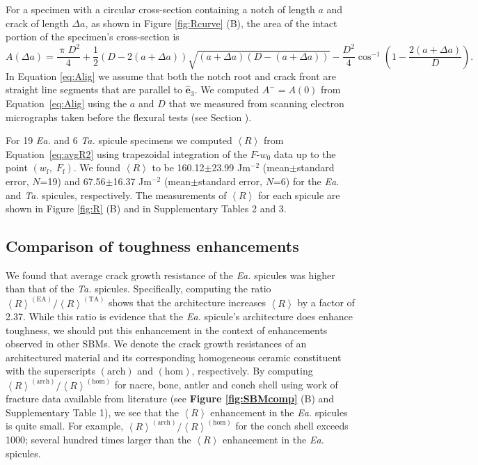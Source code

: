 \documentclass[12pt,onecolumn]{article}
\makeatletter
\DeclareRobustCommand*{\nameref}[1]{%
      \emph{\myorg@nameref{#1}}%
    }%
\newcommand{\ez}{\hat{\mathbf{e}}_3}
\newcommand{\TA}{\textit{Ta.\@}\xspace}
\newcommand{\EA}{\textit{Ea.\@}\xspace}
\makeatother
\begin{document}
For a specimen with a circular cross-section containing a notch of length $a$ and crack of length $\Delta a$, as shown in Figure \ref{fig:Rcurve} (B), the area of the intact portion of the specimen's cross-section is
%
\begin{equation}
    \label{eq:Alig}
    A(\Delta a)=\frac{\uppi D^2}{4}+\frac{1}{2}\left(D-2(a+\Delta a)\right)\sqrt{(a+\Delta a)(D-(a+\Delta a))}-\frac{D^2}{4}\cos^{-1}\left(1-\frac{2(a+\Delta a)}{D}\right).
\end{equation}
%
In Equation \eqref{eq:Alig} we assume that both the notch root and crack front are straight line segments that are parallel to $\ez$. We computed $A^-=A(0)$ from Equation~\eqref{eq:Alig} using the $a$ and $D$ that we measured from scanning electron micrographs taken before the flexural tests (see Section \nameref{sec:res}).

For 19 \EA and 6 \TA spicule specimens we computed $\left< R\right>$ from Equation~\eqref{eq:avgR2} using trapezoidal integration of the $F$-$w_0$ data up to the point $(w_\mathrm{f}, \; F_\mathrm{f})$. We found  $\left< R \right>$ to be 160.12$\pm$23.99 Jm$^{-2}$ (mean$\pm$standard error, $N$=19) and 67.56$\pm$16.37 Jm$^{-2}$ (mean$\pm$standard error, $N$=6) for the \EA and \TA spicules, respectively. The measurements of $\left< R \right>$ for each spicule are shown in Figure \ref{fig:R} (B) and in Supplementary Tables 2 and 3.

\subsection*{Comparison of toughness enhancements}
\label{sec:Rcomp}
We found that average crack growth resistance of the \EA spicules was higher than that of the \TA spicules. Specifically, computing the ratio $\left< R\right>^{(\mathrm{EA})}/\left< R\right>^{(\mathrm{TA})}$ shows that the architecture increases $\left< R\right>$ by a factor of 2.37. While this ratio is evidence that the \EA spicule's architecture does enhance toughness, we should put this enhancement in the context of enhancements observed in other SBMs. We denote the crack growth resistances of an architectured material and its corresponding homogeneous ceramic constituent with the superscripts $(\mathrm{arch})$ and $(\mathrm{hom})$, respectively. By computing $\left< R\right>^{(\mathrm{arch})}/\left< R\right>^{(\mathrm{hom})}$ for nacre, bone, antler and conch shell using work of fracture data available from literature (see {\bf Figure \ref{fig:SBMcomp}} (B) and Supplementary Table 1), we see that the $\left< R \right>$ enhancement in the \EA spicules is quite small. For example, $\left< R\right>^{(\mathrm{arch})}/\left< R\right>^{(\mathrm{hom})}$ for the conch shell exceeds 1000; several hundred times larger than the $\left< R \right>$ enhancement in the \EA spicules.
\end{document}
